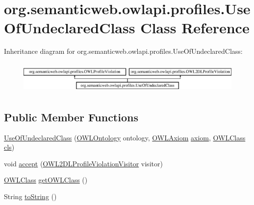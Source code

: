 \hypertarget{classorg_1_1semanticweb_1_1owlapi_1_1profiles_1_1_use_of_undeclared_class}{\section{org.\-semanticweb.\-owlapi.\-profiles.\-Use\-Of\-Undeclared\-Class Class Reference}
\label{classorg_1_1semanticweb_1_1owlapi_1_1profiles_1_1_use_of_undeclared_class}
}
Inheritance diagram for org.\-semanticweb.\-owlapi.\-profiles.\-Use\-Of\-Undeclared\-Class\-:\begin{figure}[H]
\begin{center}
\leavevmode
\includegraphics[height=1.637427cm]{classorg_1_1semanticweb_1_1owlapi_1_1profiles_1_1_use_of_undeclared_class}
\end{center}
\end{figure}
\subsection*{Public Member Functions}
\begin{DoxyCompactItemize}
\item 
\hyperlink{classorg_1_1semanticweb_1_1owlapi_1_1profiles_1_1_use_of_undeclared_class_a745ffcdc35b0893b7d9a6ec4c8d36fed}{Use\-Of\-Undeclared\-Class} (\hyperlink{interfaceorg_1_1semanticweb_1_1owlapi_1_1model_1_1_o_w_l_ontology}{O\-W\-L\-Ontology} ontology, \hyperlink{interfaceorg_1_1semanticweb_1_1owlapi_1_1model_1_1_o_w_l_axiom}{O\-W\-L\-Axiom} \hyperlink{classorg_1_1semanticweb_1_1owlapi_1_1profiles_1_1_o_w_l_profile_violation_aa7c8e8910ed3966f64a2c003fb516214}{axiom}, \hyperlink{interfaceorg_1_1semanticweb_1_1owlapi_1_1model_1_1_o_w_l_class}{O\-W\-L\-Class} \hyperlink{classorg_1_1semanticweb_1_1owlapi_1_1profiles_1_1_use_of_undeclared_class_aa6d039afe908394e6f1c68d8532a982a}{cls})
\item 
void \hyperlink{classorg_1_1semanticweb_1_1owlapi_1_1profiles_1_1_use_of_undeclared_class_ab1615000d596bc882f4547cb52284ee8}{accept} (\hyperlink{interfaceorg_1_1semanticweb_1_1owlapi_1_1profiles_1_1_o_w_l2_d_l_profile_violation_visitor}{O\-W\-L2\-D\-L\-Profile\-Violation\-Visitor} visitor)
\item 
\hyperlink{interfaceorg_1_1semanticweb_1_1owlapi_1_1model_1_1_o_w_l_class}{O\-W\-L\-Class} \hyperlink{classorg_1_1semanticweb_1_1owlapi_1_1profiles_1_1_use_of_undeclared_class_a586859df73283605cb095b0b5d641b5d}{get\-O\-W\-L\-Class} ()
\item 
String \hyperlink{classorg_1_1semanticweb_1_1owlapi_1_1profiles_1_1_use_of_undeclared_class_addd35f47644cf8eef9cc2fec526b74fc}{to\-String} ()
\end{DoxyCompactItemize}
